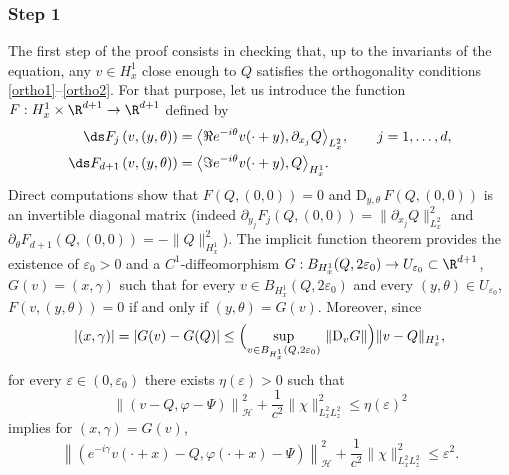 \subsubsection*{Step 1} The first step of the proof consists in checking that, up to the invariants of the equation, any $v\in H_{x}^{1}$ close enough to $Q$ satisfies the orthogonality conditions \eqref{ortho1}--\eqref{ortho2}. For that purpose, let us introduce the function $F:H_{x}^{1}\times\R^{d+1}\to\R^{d+1}$ defined by
\begin{align*}
\ds F_{j}\left(v,(y,\theta)\right)&=\bigl\langle\Re e^{-i\theta}v(\cdot+y),\partial_{x_{j}}Q\bigr\rangle_{L_{x}^{2}},\qquad j=1,\ldots,d,\\
\ds F_{d+1}\left(v,(y,\theta)\right)&=\bigl\langle\Im e^{-i\theta}v(\cdot+y),Q\bigr\rangle_{H_{x}^{1}}.
\end{align*}
Direct computations show that $F\left(Q,(0,0)\right)=0$ and $\mathrm{D}_{y,\theta}\,F\left(Q,(0,0)\right)$ is an invertible diagonal matrix (indeed $\partial_{y_{j}}F_{j}\left(Q,(0,0)\right)=\|\partial_{x_{j}}Q\|_{L_{x}^{2}}^{2}$ and $\partial_{\theta}F_{d+1}\left(Q,(0,0)\right)=-\|Q\|_{H_{x}^{1}}^{2}$). The implicit function theorem provides the existence of $\varepsilon_{0}>0$ and a $C^{1}$\nobreakdash-diffeo\-morphism $G:B_{H_{x}^{1}}(Q,2\varepsilon_{0})\to U_{\varepsilon_{0}}\subset\R^{d+1}$, $G(v)=(x,\gamma)$ such that for every $v\in B_{H_{x}^{1}}(Q,2\varepsilon_{0})$ and every $(y,\theta)\in U_{\varepsilon_{0}}$, $F\left(v,(y,\theta)\right)=0$ if and only if $(y,\theta)=G(v)$. Moreover, since
\[
|(x,\gamma)|=|G(v)-G(Q)|\leq\Bigl(\sup_{v\in B_{H_{x}^{1}}(Q,2\varepsilon_{0})}\,\|\mathrm{D}_{v}G\|\Bigr)\|v-Q\|_{H_{x}^{1}},
\]
for every $\varepsilon\in(0,\varepsilon_{0})$ there exists $\eta(\varepsilon)>0$ such that
\[
\left\|(v-Q,\varphi-\Psi)\right\|_{\mathscr{H}}^{2}+\frac{1}{c^{2}}\|\chi\|_{L_{x}^{2}L_{z}^{2}}^{2}\leq\eta(\varepsilon)^{2}
\]
implies for $(x,\gamma)=G(v)$,
\[
\left\|(e^{-i\gamma}v(\cdot+x)-Q,\varphi(\cdot+x)-\Psi)\right\|_{\mathscr{H}}^{2}+\frac{1}{c^{2}}\|\chi\|_{L_{x}^{2}L_{z}^{2}}^{2}\leq\varepsilon^{2}.
\]

